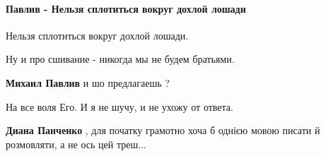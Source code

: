  
 
 
 
 
\paragraph{Павлив - Нельзя сплотиться вокруг дохлой лошади}

\begin{itemize}

					

Нельзя сплотиться вокруг дохлой лошади.

Ну и про сшивание - никогда мы не будем братьями.

\begin{itemize}
 
\textbf{Михаил Павлив} и шо предлагаешь ?

 

На все воля Его. И я не шучу, и не ухожу от ответа.

 
\textbf{Диана Панченко} , для початку грамотно хоча б однією мовою писати й розмовляти, а не ось цей треш...


 

\end{itemize}
\end{itemize}
